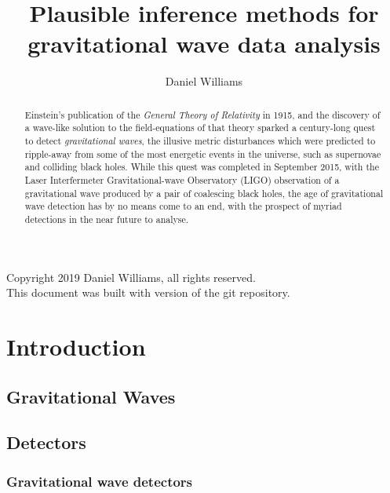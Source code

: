 \documentclass{kentigern}
\title{Plausible inference methods for gravitational wave data analysis}
\author{Daniel Williams}
\theoremstyle{definition}
\begin{document}
\openleft
\frontmatter
\thesistitle

\begin{abstract}
  Einstein's publication of the \textit{General Theory of Relativity} in 1915, and the discovery of a wave-like solution to the field-equations of that theory sparked a century-long quest to detect \textit{gravitational waves},
  the illusive metric disturbances which were predicted to ripple-away from some of the most energetic events in the universe, such as supernovae and colliding black holes.
  While this quest was completed in September 2015, with the Laser Interfermeter Gravitational-wave Observatory (LIGO) observation of a gravitational wave produced by a pair of coalescing black holes,
  the age of gravitational wave detection has by no means come to an end,
  with the prospect of myriad detections in the near future to analyse.
\end{abstract}
\newpage

Copyright 2019 Daniel Williams, all rights reserved.\\

This document was built with version  of the git repository.

\newpage
\tableofcontents
\newpage
\listoffigures
\newpage
\listoftables

\newpage


\mainmatter
\part{Introduction}
\label{part:intro}

 \chapter{Gravitational Waves}
 \label{cha:grav-waves}
 


 \chapter{Detectors}
 \label{cha:detectors}

 \section{Gravitational wave detectors}
 \label{sec:detectors}
\end{document}
